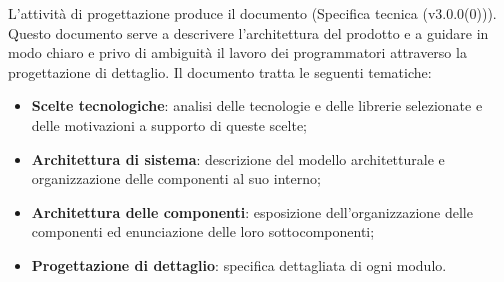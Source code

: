 \documentclass[10pt, a4paper]{article}
\begin{document}
L'attività di progettazione produce il documento (Specifica tecnica (v3.0.0(0))). Questo documento serve a descrivere l'architettura del prodotto e a guidare in modo chiaro e privo di ambiguità il lavoro dei programmatori attraverso la progettazione di dettaglio.
Il documento tratta le seguenti tematiche:
\begin{itemize}
    \item \textbf{Scelte tecnologiche}: analisi delle tecnologie e delle librerie selezionate e delle motivazioni a supporto di queste scelte;
    \item \textbf{Architettura di sistema}: descrizione del modello architetturale e organizzazione delle componenti al suo interno;
    \item \textbf{Architettura delle componenti}: esposizione dell'organizzazione delle componenti ed enunciazione delle loro sottocomponenti;
    \item \textbf{Progettazione di dettaglio}: specifica dettagliata di ogni modulo.
\end{itemize}
\end{document}
